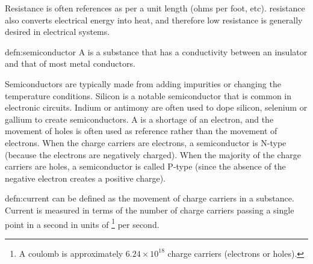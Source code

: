 Resistance is often references as per a unit length (ohms per foot, etc). resistance also converts electrical energy into heat, and therefore low resistance is generally desired in electrical systems. 

\begin{defn}[Semiconductor]{defn:semiconductor}
A  is a substance that has a conductivity between an insulator and that of most metal conductors.
\end{defn}

Semiconductors are typically made from adding impurities or changing the temperature conditions. Silicon is a notable semiconductor that is common in electronic circuits. Indium or antimony are often used to dope silicon, selenium or gallium to create semiconductors. A  is a shortage of an electron, and the movement of holes is often used as reference rather than the movement of electrons. When the charge carriers are electrons, a semiconductor is N-type (because the electrons are negatively charged). When the majority of the charge carriers are holes, a semiconductor is called P-type (since the absence of the negative electron creates a positive charge).

\begin{defn}[Current]{defn:current}
 can be defined as the movement of charge carriers in a substance. Current is measured in terms of the number of charge carriers passing a single point in a second in units of \footnote{A coulomb is approximately $6.24 \times 10^{18}$ charge carriers (electrons or holes).} per second.
\end{defn}







